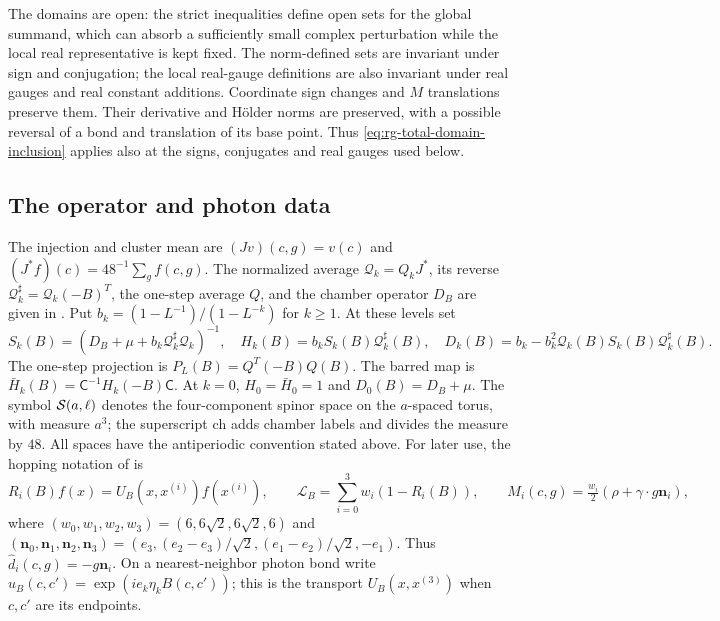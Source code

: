 The domains are open: the strict inequalities define open
sets for the global summand, which can absorb a sufficiently
small complex perturbation while the local real representative
is kept fixed. The norm-defined sets are invariant under sign
and conjugation; the local real-gauge definitions are also
invariant under real gauges and real constant additions.
Coordinate sign changes and $M$ translations preserve them.
Their derivative and H\"older norms are preserved, with a
possible reversal of a bond and translation of its base point.
Thus \eqref{eq:rg-total-domain-inclusion} applies also at the
signs, conjugates and real gauges used below.



\subsection{The operator and photon data}

The injection and cluster mean are
$(Jv)(c,g)=v(c)$ and $(J^*f)(c)=48^{-1}\sum_gf(c,g)$.
The normalized average $\mathcal Q_k=Q_kJ^*$, its reverse
$\mathcal Q_k^\sharp=\mathcal Q_k(-B)^T$, the one-step average
$Q$, and the chamber operator $D_B$ are given in
\cite[\S1]{FermionBlockManuscript}. Put $b_k=(1-L^{-1})/(1-L^{-k})$ for $k\ge1$. At these levels set
\[
 S_k(B)=(D_B+\mu+b_k\mathcal Q_k^\sharp\mathcal Q_k)^{-1},\quad
 H_k(B)=b_kS_k(B)\mathcal Q_k^\sharp(B),\quad
 D_k(B)=b_k-b_k^2\mathcal Q_k(B)S_k(B)\mathcal Q_k^\sharp(B).
\]
The one-step projection is $P_L(B)=Q^T(-B)Q(B)$. The barred map is $\bar H_k(B)=\mathsf C^{-1}H_k(-B)\mathsf C$.
At $k=0$, $H_0=\bar H_0=1$ and $D_0(B)=D_B+\mu$.
The symbol $\mathcal S(a,\ell)$ denotes the four-component spinor
space on the $a$-spaced torus, with measure $a^3$; the superscript
$\mathrm{ch}$ adds chamber labels and divides the measure by $48$.
All spaces have the antiperiodic convention stated above.
For later use, the hopping notation of \cite[\S2.1]{FermionBlockManuscript} is
\[
 R_i(B)f(x)=U_B(x,x^{(i)})f(x^{(i)}),\qquad
 \mathcal L_B=\sum_{i=0}^3w_i(1-R_i(B)),\qquad
 M_i(c,g)=\tfrac{w_i}{2}(\rho+\gamma\cdot g\mathbf n_i),
\]
where $(w_0,w_1,w_2,w_3)=(6,6\sqrt2,6\sqrt2,6)$ and
$(\mathbf n_0,\mathbf n_1,\mathbf n_2,\mathbf n_3)=(e_3,(e_2-e_3)/\sqrt2,(e_1-e_2)/\sqrt2,-e_1)$.
Thus $\widehat d_i(c,g)=-g\mathbf n_i$. On a nearest-neighbor photon bond
write $u_B(c,c')=\exp(ie_k\eta_kB(c,c'))$; this is the transport
$U_B(x,x^{(3)})$ when $c,c'$ are its endpoints.

